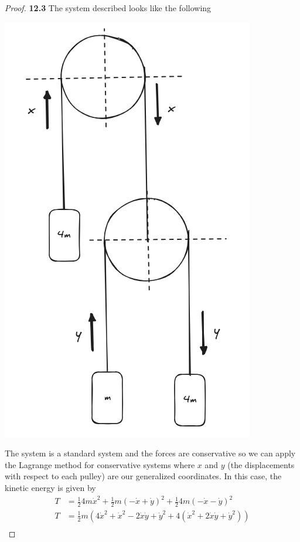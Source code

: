 \documentclass[11pt]{article}
\theoremstyle{definition}
\begin{document}
\begin{proof}{\textbf{12.3}}
    The system described looks like the following
    \begin{center}
        \includegraphics[scale=0.45]{ch12-3.png}
    \end{center}
    The system is a standard system and the forces are conservative so we can
    apply the Lagrange method for conservative systems where $x$ and
    $y$ (the displacements with respect to each pulley) are our generalized
    coordinates. In this case, the kinetic energy is given by
    \begin{align*}
        T &= \frac{1}{2}4m\dot{x}^2
        + \frac{1}{2}m(-\dot{x} + \dot{y})^2 + \frac{1}{2}4m(-\dot{x} - \dot{y})^2\\
        T &= \frac{1}{2}m(4\dot{x}^2 + \dot{x}^2 - 2\dot{x}\dot{y} + \dot{y}^2 
        + 4(\dot{x}^2 + 2\dot{x}\dot{y} + \dot{y}^2))\\

\end{align*}
\end{proof}
\end{document}
